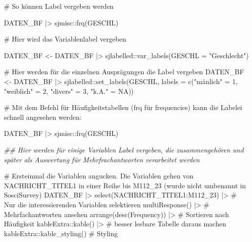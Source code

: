 \documentclass[twoside, pagesize, fontsize=11pt, dvipsnames]{scrreport}
\newenvironment{Shaded}{\begin{snugshade}}{\end{snugshade}}
\newcommand{\AttributeTok}[1]{\textcolor[rgb]{0.40,0.45,0.13}{#1}}
\newcommand{\CommentTok}[1]{\textcolor[rgb]{0.37,0.37,0.37}{#1}}
\newcommand{\ConstantTok}[1]{\textcolor[rgb]{0.56,0.35,0.01}{#1}}
\newcommand{\DecValTok}[1]{\textcolor[rgb]{0.68,0.00,0.00}{#1}}
\newcommand{\DocumentationTok}[1]{\textcolor[rgb]{0.37,0.37,0.37}{\textit{#1}}}
\newcommand{\FunctionTok}[1]{\textcolor[rgb]{0.28,0.35,0.67}{#1}}
\newcommand{\NormalTok}[1]{\textcolor[rgb]{0.00,0.23,0.31}{#1}}
\newcommand{\OtherTok}[1]{\textcolor[rgb]{0.00,0.23,0.31}{#1}}
\newcommand{\SpecialCharTok}[1]{\textcolor[rgb]{0.37,0.37,0.37}{#1}}
\newcommand{\StringTok}[1]{\textcolor[rgb]{0.13,0.47,0.30}{#1}}
\begin{document}
\begin{Shaded}
\begin{Highlighting}[]
\CommentTok{\# So können Label vergeben werden}

\NormalTok{DATEN\_BF }\SpecialCharTok{|\textgreater{}}\NormalTok{ sjmisc}\SpecialCharTok{::}\FunctionTok{frq}\NormalTok{(GESCHL)}

\CommentTok{\# Hier wird das Variablenlabel vergeben}

\NormalTok{DATEN\_BF }\OtherTok{\textless{}{-}}\NormalTok{ DATEN\_BF }\SpecialCharTok{|\textgreater{}} 
\NormalTok{  sjlabelled}\SpecialCharTok{::}\FunctionTok{var\_labels}\NormalTok{(}\AttributeTok{GESCHL =} \StringTok{"Geschlecht"}\NormalTok{) }

\CommentTok{\# Hier werden für die einzelnen Ausprägungen die Label vergeben}
\NormalTok{DATEN\_BF }\OtherTok{\textless{}{-}}\NormalTok{ DATEN\_BF }\SpecialCharTok{|\textgreater{}} 
\NormalTok{  sjlabelled}\SpecialCharTok{::}\FunctionTok{set\_labels}\NormalTok{(GESCHL, }\AttributeTok{labels =} \FunctionTok{c}\NormalTok{(}\StringTok{"mänlich"} \OtherTok{=} \DecValTok{1}\NormalTok{, }\StringTok{"weiblich"} \OtherTok{=} \DecValTok{2}\NormalTok{, }\StringTok{"divers"} \OtherTok{=} \DecValTok{3}\NormalTok{, }\StringTok{"k.A."} \OtherTok{=} \ConstantTok{NA}\NormalTok{))}

\CommentTok{\# Mit dem Befehl für Häufigkeitstabellen (frq für frequencies) kann die Labelei schnell angesehen werden:}

\NormalTok{DATEN\_BF }\SpecialCharTok{|\textgreater{}} 
\NormalTok{  sjmisc}\SpecialCharTok{::}\FunctionTok{frq}\NormalTok{(GESCHL)}

\DocumentationTok{\#\# Hier werden für einige Variablen Label vergeben, die zusammengehören und später als Auswertung für Mehrfrachantworten verarbeitet werden}

\CommentTok{\# Ersteinmal die Variablen angucken. Die Variablen gehen von NACHRICHT\_TITEL1 in einer Reihe bis M112\_23 (wurde nicht umbenannt in SosciSurvey)}
\NormalTok{DATEN\_BF }\SpecialCharTok{|\textgreater{}} 
  \FunctionTok{select}\NormalTok{(NACHRICHT\_TITEL1}\SpecialCharTok{:}\NormalTok{M112\_23) }\SpecialCharTok{|\textgreater{}} \CommentTok{\# Nur die interessierenden Variablen selektieren}
  \FunctionTok{multiResponse}\NormalTok{() }\SpecialCharTok{|\textgreater{}} \CommentTok{\# Mehrfachantworten ansehen}
  \FunctionTok{arrange}\NormalTok{(}\FunctionTok{desc}\NormalTok{(Frequency)) }\SpecialCharTok{|\textgreater{}} \CommentTok{\# Sortieren nach Häufigkeit}
\NormalTok{  kableExtra}\SpecialCharTok{::}\FunctionTok{kable}\NormalTok{() }\SpecialCharTok{|\textgreater{}} \CommentTok{\# besser lesbare Tabelle daraus machen}
\NormalTok{  kableExtra}\SpecialCharTok{::}\FunctionTok{kable\_styling}\NormalTok{() }\CommentTok{\# Styling}



\end{Highlighting}
\end{Shaded}
\end{document}
